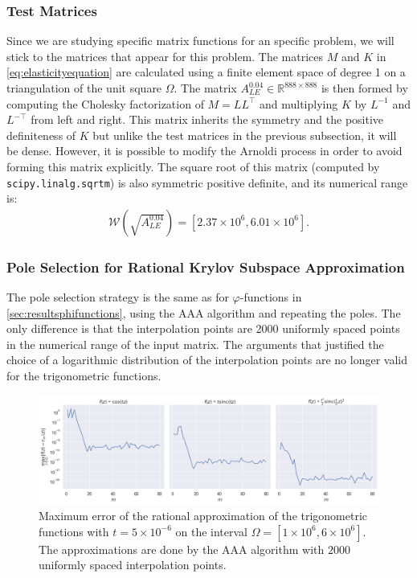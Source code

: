 \subsubsection*{Test Matrices}
Since we are studying specific matrix functions for an specific problem, we will stick to the
matrices that appear for this problem.
The matrices $M$ and $K$ in \eqref{eq:elasticityequation} are calculated using a finite element space
of degree 1 on a triangulation of the unit square $\Omega$.
The matrix $A_{LE}^{0.04} \in \mathbb{R}^{888\times888}$ is then formed by computing the Cholesky
factorization of $M = LL^{\top}$ and multiplying $K$ by $L^{-1}$ and $L^{-\top}$ from left and right.
This matrix inherits the symmetry and the positive definiteness of $K$ but unlike the test matrices
in the previous subsection, it will be dense.
However, it is possible to modify the Arnoldi process in order to avoid forming this matrix
explicitly.
The square root of this matrix (computed by \texttt{scipy.linalg.sqrtm}) is also symmetric
positive definite, and its numerical range is:
\begin{gather*}
    \mathcal{W}\left(\sqrt{A_{LE}^{0.04}}\right) = [2.37 \times 10^{6}, 6.01 \times 10^{6}].
\end{gather*}

\subsubsection*{Pole Selection for Rational Krylov Subspace Approximation}
The pole selection strategy is the same as for $\varphi$-functions in \autoref{sec:resultsphifunctions},
using the AAA algorithm and repeating the poles.
The only difference is that the interpolation points are 2000 uniformly spaced points in the
numerical range of the input matrix. The arguments that justified the choice of a logarithmic
distribution of the interpolation points are no longer valid for the trigonometric functions.

\begin{figure}[h]
    \centering
    \includegraphics[width=.9\textwidth]{img/trigonometric/AAA_errors_t5e-06.png}
    \caption{
        Maximum error of the rational approximation of the trigonometric functions
        with $t=5\times10^{-6}$ on the interval $\Omega = [1 \times 10^{6}, 6 \times 10^{6}]$.
        The approximations are done by the AAA algorithm with $2000$ uniformly spaced
        interpolation points.
    }
    \label{fig:trigonometricAAAerrors}
\end{figure}

